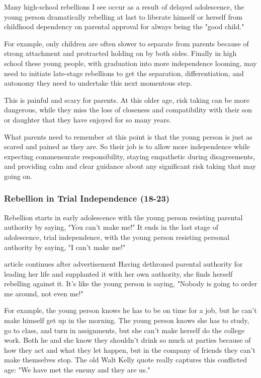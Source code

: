 \documentclass[10pt,a4paper]{article}
\begin{document}
Many high-school rebellions I see occur as a result of delayed adolescence, the young person dramatically rebelling at last to liberate himself or herself from childhood dependency on parental approval for always being the "good child."

For example, only children are often slower to separate from parents because of strong attachment and protracted holding on by both sides. Finally in high school these young people, with graduation into more independence looming, may need to initiate late-stage rebellions to get the separation, differentiation, and autonomy they need to undertake this next momentous step.

This is painful and scary for parents. At this older age, risk taking can be more dangerous, while they miss the loss of closeness and compatibility with their son or daughter that they have enjoyed for so many years.

What parents need to remember at this point is that the young person is just as scared and pained as they are. So their job is to allow more independence while expecting commensurate responsibility, staying empathetic during disagreements, and providing calm and clear guidance about any significant risk taking that may going on.

\subsubsection{Rebellion in Trial Independence (18-23)}

Rebellion starts in early adolescence with the young person resisting parental authority by saying, "You can't make me!" It ends in the last stage of adolescence, trial independence, with the young person resisting personal authority by saying, "I can't make me!"

article continues after advertisement
Having dethroned parental authority for leading her life and supplanted it with her own authority, she finds herself rebelling against it. It's like the young person is saying, "Nobody is going to order me around, not even me!"

For example, the young person knows he has to be on time for a job, but he can't make himself get up in the morning. The young person knows she has to study, go to class, and turn in assignments, but she can't make herself do the college work. Both he and she know they shouldn't drink so much at parties because of how they act and what they let happen, but in the company of friends they can't make themselves stop. The old Walt Kelly quote really captures this conflicted age: "We have met the enemy and they are us."
\end{document}
